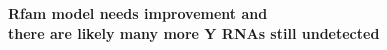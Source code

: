 \documentclass[landscape]{slides}
\begin{document}
\begin{slide}
\begin{center}
\textbf{Rfam model needs improvement and \\ there are likely many more
  Y RNAs still undetected}


\end{center}
\vfill
\end{slide}
\end{document}
